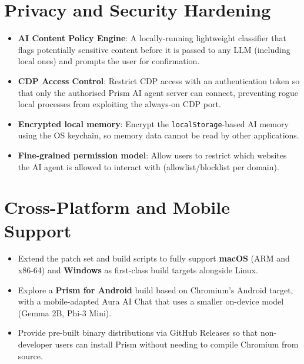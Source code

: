 \section{Privacy and Security Hardening}
\begin{itemize}[leftmargin=*]
    \item \textbf{AI Content Policy Engine}: A locally-running lightweight classifier that flags potentially sensitive content before it is passed to any LLM (including local ones) and prompts the user for confirmation.
    \item \textbf{CDP Access Control}: Restrict CDP access with an authentication token so that only the authorised Prism AI agent server can connect, preventing rogue local processes from exploiting the always-on CDP port.
    \item \textbf{Encrypted local memory}: Encrypt the \texttt{localStorage}-based AI memory using the OS keychain, so memory data cannot be read by other applications.
    \item \textbf{Fine-grained permission model}: Allow users to restrict which websites the AI agent is allowed to interact with (allowlist/blocklist per domain).
\end{itemize}

\section{Cross-Platform and Mobile Support}
\begin{itemize}[leftmargin=*]
    \item Extend the patch set and build scripts to fully support \textbf{macOS} (ARM and x86-64) and \textbf{Windows} as first-class build targets alongside Linux.
    \item Explore a \textbf{Prism for Android} build based on Chromium's Android target, with a mobile-adapted Aura AI Chat that uses a smaller on-device model (Gemma 2B, Phi-3 Mini).
    \item Provide pre-built binary distributions via GitHub Releases so that non-developer users can install Prism without needing to compile Chromium from source.
\end{itemize}

